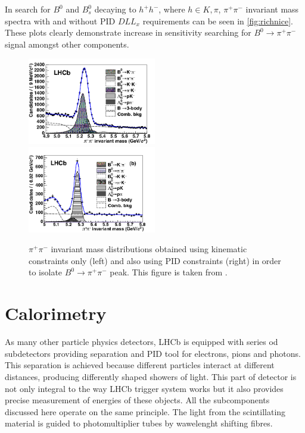 In search for $B^{0}$ and $B^{0}_{s}$ decaying to $h^{+}h^{-}$, where $h\in K, \pi$, $\pi^{+} \pi^{-}$ invariant mass spectra with and without PID $DLL_{x}$ requirements can be seen in \autoref{fig:richnice}. These plots clearly demonstrate increase in sensitivity searching for $B^{0} \rightarrow \pi^{+} \pi^{-}$ signal amongst other components. 

\begin{figure}[!h]
	\centering
	\includegraphics[width = 0.5\textwidth]{figs/detector/b2hhnopid.png}%
	\includegraphics[width = 0.5\textwidth]{figs/detector/b2hhpid.png}%
	\caption{ $\pi^{+} \pi^{-}$ invariant mass distributions obtained using kinematic constraints only (left) and also using PID constraints (right) in order to isolate $B^{0} \rightarrow \pi^{+} \pi^{-}$ peak. This figure is taken from \cite{LHCb-PAPER-2012-002}. }  
	\label{fig:richnice}
\end{figure}


\section{Calorimetry}
As many other particle physics detectors, \Gls{LHCb} is equipped with series od subdetectors providing separation and \Gls{PID} tool for electrons, pions and photons. This separation is achieved because different particles interact at different distances, producing differently shaped showers of light. This part of detector is not only integral to the way \Gls{LHCb} trigger system works but it also provides precise measurement of energies of these objects.
All the subcomponents discussed here operate on the same principle. The light from the scintillating material is guided to photomultiplier tubes by wawelenght shifting fibres.

